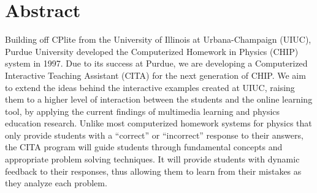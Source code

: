 \chapter[Abstract]{Abstract}

Building off CPlite from the University of Illinois at Urbana-Champaign (UIUC), Purdue University developed the Computerized Homework in Physics (CHIP) system in 1997. Due to its success at Purdue, we are developing a Computerized Interactive Teaching Assistant (CITA) for the next generation of CHIP. We aim to extend the ideas behind the interactive examples created at UIUC, raising them to a higher level of interaction between the students and the online learning tool, by applying the current findings of multimedia learning and physics education research. Unlike most computerized homework systems for physics that only provide students with a ``correct'' or ``incorrect'' response to their answers, the CITA program will guide students through fundamental concepts and appropriate problem solving techniques. It will provide students with dynamic feedback to their responses, thus allowing them to learn from their mistakes as they analyze each problem.